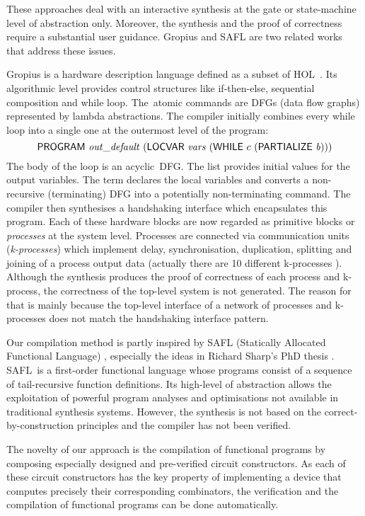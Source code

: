 \documentclass{llncs}
\begin{document}
These approaches deal with an interactive
synthesis at the gate or state-machine level
of abstraction only. Moreover, the synthesis
and the proof of correctness require a 
substantial user guidance. Gropius and SAFL 
are two related works that address these issues.

Gropius is a hardware description language
defined as a subset of HOL~\mbox{\cite{Blu01,Gropius1}}.
Its algorithmic level
provides control structures like if-then-else,
sequential composition and while loop.
The~atomic commands are DFGs (data flow
graphs) represented by lambda abstractions.
The compiler initially combines every while loop into
a single one at the outermost level of the
program:
\[
\DEF{PROGRAM}\ \VAR{out\_default}\ (\DEF{LOCVAR}\ \VAR{vars}\ 
(\DEF{WHILE}\ c\ (\DEF{PARTIALIZE}\ \VAR{b})))
\]
The body  of the  loop is an acyclic~DFG.
The list 
provides initial values for the output variables.
The term  declares the local variables
 and  converts a
non-recursive (terminating) DFG into a potentially
non-terminating command.
The compiler then synthesises a handshaking
interface which encapsulates this program.
Each of these hardware blocks are now regarded
as primitive blocks or {\em processes\/} at the system level.
Processes are connected via communication
units ({\em k-processes\/}) which implement delay,
synchronisation, duplication,
splitting and joining of a process output data
(actually there  are 10 different k-processes \cite{Blu01}).
Although the synthesis produces the proof of
correctness of each process and k-process,
the correctness of the top-level system is not generated.
The reason for that is mainly because
the top-level interface of a network of processes and 
k-processes does not match the handshaking interface pattern.

Our compilation method is partly inspired by SAFL 
(Statically Allocated Functional Language) \cite{MS01b},
especially the ideas in Richard Sharp's PhD thesis \cite{Sha02}. 
SAFL~is a first-order functional language whose
programs consist of a sequence of tail-recursive function 
definitions. Its high-level of abstraction allows
the exploitation of powerful program analyses
and optimisations not available in traditional
synthesis systems. 
However, the synthesis is not based on
the correct-by-construction principles
and the compiler has not been verified.

The novelty of our approach is the 
compilation of functional programs by
composing especially designed and
pre-verified circuit constructors.
%
As each of these circuit constructors
has the key property of implementing
a device that computes precisely their
corresponding combinators, 
the verification and the compilation of 
functional programs can be done
automatically.
\end{document}
